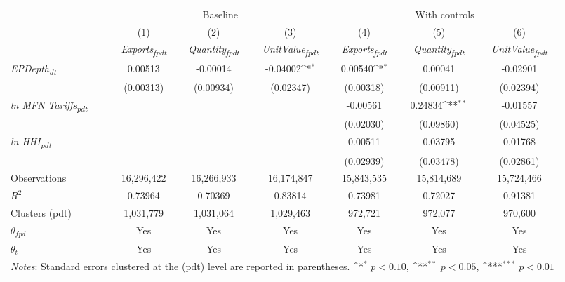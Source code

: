 {
\def\sym#1{\ifmmode^{#1}\else\(^{#1}\)\fi}
\begin{tabular}{l*{6}{c}}
\toprule
&\multicolumn{3}{c}{Baseline}&\multicolumn{3}{c}{With controls}\\\cmidrule(lr){2-4}\cmidrule(lr){5-7}
&(1)&(2)&(3)&(4)&(5)&(6)\\
&\textit{Exports\textsubscript{fpdt}}&\textit{Quantity\textsubscript{fpdt}}&\textit{UnitValue\textsubscript{fpdt}}&\textit{Exports\textsubscript{fpdt}}&\textit{Quantity\textsubscript{fpdt}}&\textit{UnitValue\textsubscript{fpdt}}\\
\midrule
\textit{EPDepth\textsubscript{dt}} & 0.00513 & -0.00014 & -0.04002\sym{*} & 0.00540\sym{*} & 0.00041 & -0.02901\\
 & (0.00313) & (0.00934) & (0.02347) & (0.00318) & (0.00911) & (0.02394)\\
\addlinespace
\textit{ln MFN Tariffs\textsubscript{pdt}} &  &  &  & -0.00561 & 0.24834\sym{**} & -0.01557\\
 &  &  &  & (0.02030) & (0.09860) & (0.04525)\\
\addlinespace
\textit{ln HHI\textsubscript{pdt}} &  &  &  & 0.00511 & 0.03795 & 0.01768\\
 &  &  &  & (0.02939) & (0.03478) & (0.02861)\\
\midrule
Observations & 16,296,422 & 16,266,933 & 16,174,847 & 15,843,535 & 15,814,689 & 15,724,466\\
$R^{2}$ & 0.73964 & 0.70369 & 0.83814 & 0.73981 & 0.72027 & 0.91381\\
Clusters (pdt) & 1,031,779 & 1,031,064 & 1,029,463 & 972,721 & 972,077 & 970,600\\
$\theta_{fpd}$ & Yes & Yes & Yes & Yes & Yes & Yes\\
$\theta_{t}$ & Yes & Yes & Yes & Yes & Yes & Yes\\
\bottomrule
\multicolumn{7}{l}{\footnotesize \textit{Notes}: Standard errors clustered at the (pdt) level are reported in parentheses. \sym{*} \(p<0.10\), \sym{**} \(p<0.05\), \sym{***} \(p<0.01\)}\\
\end{tabular}
}
